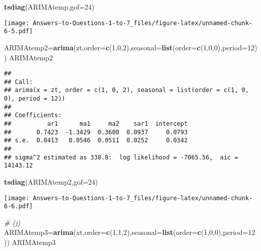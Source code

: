 \documentclass[
]{article}
\newenvironment{Shaded}{\begin{snugshade}}{\end{snugshade}}
\newcommand{\AttributeTok}[1]{\textcolor[rgb]{0.13,0.29,0.53}{#1}}
\newcommand{\CommentTok}[1]{\textcolor[rgb]{0.56,0.35,0.01}{\textit{#1}}}
\newcommand{\DecValTok}[1]{\textcolor[rgb]{0.00,0.00,0.81}{#1}}
\newcommand{\FunctionTok}[1]{\textcolor[rgb]{0.13,0.29,0.53}{\textbf{#1}}}
\newcommand{\NormalTok}[1]{#1}
\newcommand{\OtherTok}[1]{\textcolor[rgb]{0.56,0.35,0.01}{#1}}
\begin{document}
\begin{Shaded}
\begin{Highlighting}[]
\FunctionTok{tsdiag}\NormalTok{(ARIMAtemp,}\AttributeTok{gof=}\DecValTok{24}\NormalTok{)}
\end{Highlighting}
\end{Shaded}

\texttt{[image: Answers-to-Questions-1-to-7\_files/figure-latex/unnamed-chunk-6-5.pdf]}

\begin{Shaded}
\begin{Highlighting}[]
\NormalTok{ARIMAtemp2}\OtherTok{=}\FunctionTok{arima}\NormalTok{(zt,}\AttributeTok{order=}\FunctionTok{c}\NormalTok{(}\DecValTok{1}\NormalTok{,}\DecValTok{0}\NormalTok{,}\DecValTok{2}\NormalTok{),}\AttributeTok{seasonal=}\FunctionTok{list}\NormalTok{(}\AttributeTok{order=}\FunctionTok{c}\NormalTok{(}\DecValTok{1}\NormalTok{,}\DecValTok{0}\NormalTok{,}\DecValTok{0}\NormalTok{),}\AttributeTok{period=}\DecValTok{12}\NormalTok{))}
\NormalTok{ARIMAtemp2}
\end{Highlighting}
\end{Shaded}

\begin{verbatim}
## 
## Call:
## arima(x = zt, order = c(1, 0, 2), seasonal = list(order = c(1, 0, 0), period = 12))
## 
## Coefficients:
##          ar1      ma1     ma2    sar1  intercept
##       0.7423  -1.3429  0.3600  0.0937     0.0793
## s.e.  0.0413   0.0546  0.0511  0.0252     0.0342
## 
## sigma^2 estimated as 338.8:  log likelihood = -7065.56,  aic = 14143.12
\end{verbatim}

\begin{Shaded}
\begin{Highlighting}[]
\FunctionTok{tsdiag}\NormalTok{(ARIMAtemp2,}\AttributeTok{gof=}\DecValTok{24}\NormalTok{)}
\end{Highlighting}
\end{Shaded}

\texttt{[image: Answers-to-Questions-1-to-7\_files/figure-latex/unnamed-chunk-6-6.pdf]}

\begin{Shaded}
\begin{Highlighting}[]
\CommentTok{\# (j)}
\NormalTok{ARIMAtemp3}\OtherTok{=}\FunctionTok{arima}\NormalTok{(xt,}\AttributeTok{order=}\FunctionTok{c}\NormalTok{(}\DecValTok{1}\NormalTok{,}\DecValTok{1}\NormalTok{,}\DecValTok{2}\NormalTok{),}\AttributeTok{seasonal=}\FunctionTok{list}\NormalTok{(}\AttributeTok{order=}\FunctionTok{c}\NormalTok{(}\DecValTok{1}\NormalTok{,}\DecValTok{0}\NormalTok{,}\DecValTok{0}\NormalTok{),}\AttributeTok{period=}\DecValTok{12}\NormalTok{))}
\NormalTok{ARIMAtemp3}
\end{Highlighting}
\end{Shaded}
\end{document}
